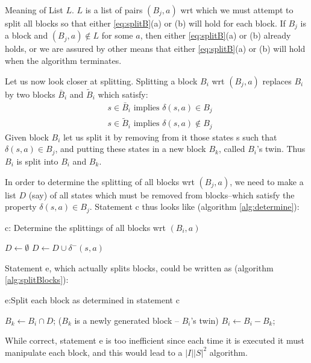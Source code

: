 Meaning of List $L$. $L$ is a list of pairs $(B_j, a)$ wrt which we must attempt to split all blocks so that either \ref{eq:splitB}(a) or (b) will hold for each block. If $B_j$ is a block and $(B_j, a)\notin L$ for some $a$, then either \ref{eq:splitB}(a) or (b) already holds, or we are assured by other means that either \ref{eq:splitB}(a) or (b) will hold when the algorithm terminates.

Let us now look closer at splitting. Splitting a block $B_i$ wrt $(B_j,a)$ replaces $B_i$ by two blocks $\bar{B}_i$ and $\tilde{B}_i$ which satisfy:
\begin{align*}
& s\in\bar{B}_i \text{  implies  } \delta(s,a)\in B_j \\
& s\in\tilde{B}_i \text{  implies  } \delta(s,a)\notin B_j 
\end{align*}
Given block $B_i$ let us split it by removing from it those states s such that $\delta(s,a)\in B_j$, and putting these states in a new block $B_k$, called $B_i$'s twin. Thus $B_i$ is split into $B_i$ and $B_k$.

In order to determine the splitting of all blocks wrt $(B_j, a)$, we need to make a list $D$ (say) of all states which must be removed from blocks--which satisfy the property $\delta(s,a)\in B_j$. Statement c thus looks like (algorithm \ref{alg:determine}):
\begin{algorithm}  
	\caption{c: Determine the splittings of all blocks wrt $(B_i, a)$} 
	\label{alg:determine} 
	\begin{algorithmic}%
		\State $D\gets\emptyset$
				\State $D\gets D\cup\delta^{-}(s,a)$
			\EndIf
		\EndFor
	\end{algorithmic}   
\end{algorithm}

Statement e, which actually splits blocks, could be written as (algorithm \ref{alg:splitBlocks}):
\begin{algorithm}  
	\caption{e:Split each block as determined in statement c} 
	\label{alg:splitBlocks} 
	\begin{algorithmic}%
			\State $B_k\gets B_i\cap D$; ($B_k$ is a newly generated block -- $B_i$'s twin)
			\State $B_i\gets B_i-B_k$;
		\EndFor
	\end{algorithmic}   
\end{algorithm}

While correct, statement e is too inefficient since each time it is executed it must manipulate each block, and this would lead to a $|I||S|^2$ algorithm. 

